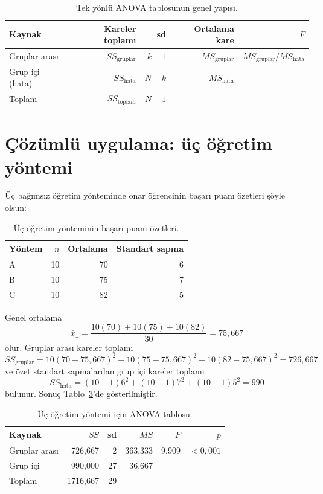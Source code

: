 \begin{table}[H]
\centering
\caption{Tek yönlü ANOVA tablosunun genel yapısı.}
\label{tab:anova-template}
\begin{tabularx}{\textwidth}{@{}>{\raggedright\arraybackslash}Xrrrr@{}}
\toprule
Kaynak & Kareler toplamı & sd & Ortalama kare & $F$ \\
\midrule
Gruplar arası & $SS_{\text{gruplar}}$ & $k-1$ & $MS_{\text{gruplar}}$ & $MS_{\text{gruplar}}/MS_{\text{hata}}$ \\
Grup içi (hata) & $SS_{\text{hata}}$ & $N-k$ & $MS_{\text{hata}}$ & \\
Toplam & $SS_{\text{toplam}}$ & $N-1$ & & \\
\bottomrule
\end{tabularx}
\end{table}

\section{Çözümlü uygulama: üç öğretim yöntemi}
\label{sec:anova-worked-example}

Üç bağımsız öğretim yönteminde onar öğrencinin başarı puanı özetleri şöyle
olsun:

\begin{table}[H]
\centering
\caption{Üç öğretim yönteminin başarı puanı özetleri.}
\label{tab:anova-group-summary}
\begin{tabular}{lrrr}
\toprule
Yöntem & $n$ & Ortalama & Standart sapma \\
\midrule
A & 10 & 70 & 6 \\
B & 10 & 75 & 7 \\
C & 10 & 82 & 5 \\
\bottomrule
\end{tabular}
\end{table}

Genel ortalama
\[
\bar x_{..}=\frac{10(70)+10(75)+10(82)}{30}=75{,}667
\]
olur. Gruplar arası kareler toplamı
\[
SS_{\text{gruplar}}
=10(70-75{,}667)^2+10(75-75{,}667)^2+10(82-75{,}667)^2
=726{,}667
\]
ve özet standart sapmalardan grup içi kareler toplamı
\[
SS_{\text{hata}}
=(10-1)6^2+(10-1)7^2+(10-1)5^2=990
\]
bulunur. Sonuç Tablo~\ref{tab:anova-worked}'de gösterilmiştir.

\begin{table}[H]
\centering
\caption{Üç öğretim yöntemi için ANOVA tablosu.}
\label{tab:anova-worked}
\begin{tabular}{lrrrrr}
\toprule
Kaynak & $SS$ & sd & $MS$ & $F$ & $p$ \\
\midrule
Gruplar arası & 726,667 & 2 & 363,333 & 9,909 & $<0{,}001$ \\
Grup içi & 990,000 & 27 & 36,667 & & \\
Toplam & 1716,667 & 29 & & & \\
\bottomrule
\end{tabular}
\end{table}

